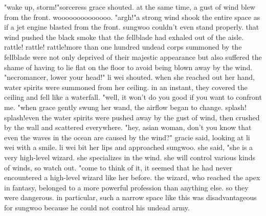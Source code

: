 "wake up, storm!"sorceress grace shouted.
 at the same time, a gust of wind blew from the front.
woooooooooooooo.
"argh!"a strong wind shook the entire space as if a jet engine blasted from the front.
 sungwoo couldn't even stand properly.
 that wind pushed the black smoke that the fellblade had exhaled out of the aisle.
rattle! rattle! rattle!more than one hundred undead corps summoned by the fellblade were not only deprived of their majestic appearance but also suffered the shame of having to lie flat on the floor to avoid being blown away by the wind.
"necromancer, lower your head!" li wei shouted.
 when she reached out her hand, water spirits were summoned from her ceiling.
in an instant, they covered the ceiling and fell like a waterfall.
"well, it won't do you good if you want to confront me.
"when grace gently swung her wand, the airflow began to change.
splash! splash!even the water spirits were pushed away by the gust of wind, then crushed by the wall and scattered everywhere.
 "hey, asian woman, don't you know that even the waves in the ocean are caused by the wind?" gracie said, looking at li wei with a smile.
 li wei bit her lips and approached sungwoo.
 she said, "she is a very high-level wizard.
 she specializes in the wind.
 she will control various kinds of winds, so watch out.
"come to think of it, it seemed that he had never encountered a high-level wizard like her before.
 the wizard, who reached the apex in fantasy, belonged to a more powerful profession than anything else.
 so they were dangerous.
in particular, such a narrow space like this was disadvantageous for sungwoo because he could not control his undead army.

